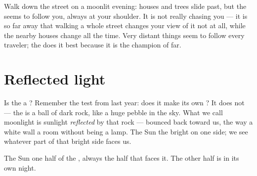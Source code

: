 \begin{example}\label{ex:g2:moon-in-the-sky:follows}
Walk down the street on a moonlit evening: houses and trees slide
past, but the  seems to follow you, always at your shoulder. It
is not really chasing you --- it is so far away that walking a whole
street changes your view of it not at all, while the nearby houses
change all the time. Very distant things seem to follow every
traveler; the  does it best because it is the champion of far.
\end{example}

\section{Reflected light}

\begin{example}\label{ex:g2:moon-in-the-sky:borrowed}
Is the  a ? Remember the test from last year: does
it make its own ? It does not --- the  is a ball of dark
rock, like a huge pebble in the sky. What we call moonlight is
sunlight \emph{reflected} by that rock --- bounced back toward us,
the way a white wall 
a room without being a lamp. The Sun  the  bright on one
side; we see whatever part of that bright side faces us.
\end{example}

\begin{omfigure}

{\small The Sun  one half of the , always the half that
faces it. The other half is in its own night.}
\end{omfigure}

